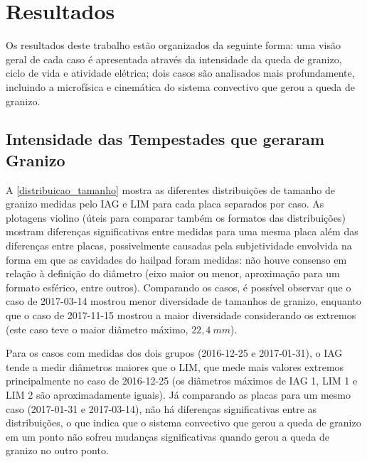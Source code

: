 \chapter{Resultados}\label{resultados}

Os resultados deste trabalho estão organizados da seguinte forma: uma visão geral de cada caso é apresentada através da intensidade da queda de granizo, ciclo de vida e atividade elétrica; dois casos são analisados mais profundamente, incluindo a microfísica e cinemática do sistema convectivo que gerou a queda de granizo.

\section{Intensidade das Tempestades que geraram Granizo}\label{ciclo_vida}

A \autoref{distribuicao_tamanho} mostra as diferentes distribuições de tamanho de granizo medidas pelo IAG e LIM para cada placa separados por caso. As plotagens violino (úteis para comparar também os formatos das distribuições) mostram diferenças significativas entre medidas para uma mesma placa além das diferenças entre placas, possivelmente causadas pela subjetividade envolvida na forma em que as cavidades do hailpad foram medidas: não houve consenso em relação à definição do diâmetro (eixo maior ou menor, aproximação para um formato esférico, entre outros). Comparando os casos, é possível observar que o caso de 2017-03-14 mostrou menor diversidade de tamanhos de granizo, enquanto que o caso de 2017-11-15 mostrou a maior diversidade considerando os extremos (este caso teve o maior diâmetro máximo, $22,4\:mm$).

Para os casos com medidas dos dois grupos (2016-12-25 e 2017-01-31), o IAG tende a medir diâmetros maiores que o LIM, que mede mais valores extremos principalmente no caso de 2016-12-25 (os diâmetros máximos de IAG 1, LIM 1 e LIM 2 são aproximadamente iguais). Já comparando as placas para um mesmo caso (2017-01-31 e 2017-03-14), não há diferenças significativas entre as distribuições, o que indica que o sistema convectivo que gerou a queda de granizo em um ponto não sofreu mudanças significativas quando gerou a queda de granizo no outro ponto. 

